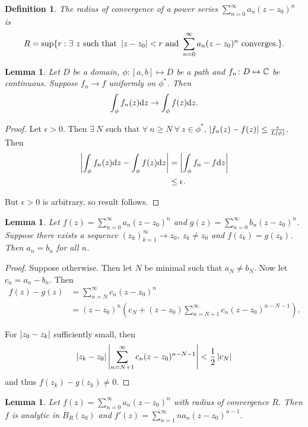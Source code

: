 \documentclass{notes}
\theoremstyle{plain}
\newtheorem{definition}[proposition]{Definition}
\newtheorem{lemma}[proposition]{Lemma}
\begin{document}
\begin{definition}
The radius of convergence of a power series
$\sum_{n=0}^\infty a_n (z-z_0)^n$ is
\[
R = \sup \{ r : \exists\ z \text{ such that } \left|z-z_0\right| < r \text{ and }
\sum_{n=0}^\infty a_n (z-z_0)^n \text{ converges.}\}.
\]
\end{definition}

\begin{lemma}
Let $D$ be a domain, $\phi \colon [a,b] \mapsto D$ be a path and $f_n \colon D \mapsto
\mathbb{C}$ be continuous.  Suppose $f_n \rightarrow f$ uniformly on $\phi^*$.  Then
\[
\int_\phi f_n(z) \mathrm{d} z \rightarrow \int_\phi f(z) \mathrm{d} z.
\]
\end{lemma}

\begin{proof}
Let $\epsilon > 0$.  Then $\exists\ N$ such that $\forall\ n \ge N\
\forall\ z \in \phi^*$, $\left|f_n(z)-f(z)\right| \le \frac{\epsilon}{L(\phi)}$.
Then
\begin{align*}
\left|\int_\phi f_n(z) \mathrm{d} z - \int_\phi f(z) \mathrm{d} z\right| &=
\left|\int_\phi f_n - f \mathrm{d} z\right| \\
&\le \epsilon.
\end{align*}

But $\epsilon > 0$ is arbitrary, so result follows. 
\end{proof}

\begin{lemma}
Let $f(z) = \sum_{n=0}^\infty a_n (z-z_0)^n$ and
$g(z) = \sum_{n=0}^\infty b_n (z-z_0)^n$.  Suppose there exists a sequence
$(z_k)_{k=1}^\infty \rightarrow z_0$, $z_k \neq z_0$ and $f(z_k) = g(z_k)$.
Then $a_n = b_n$ for all $n$.
\end{lemma}

\begin{proof}
Suppose otherwise.  Then let $N$ be minimal such that $a_N \neq b_N$.  Now
let $c_n = a_n - b_n$.  Then
\begin{align*}
f(z) - g(z) &= \sum_{n=N}^\infty c_n (z-z_0)^n \\
&= (z-z_0)^n \left( c_N + \left( z-z_0 \right) 
\sum_{n=N+1}^\infty c_n (z-z_0)^{n-N-1} \right).
\end{align*}

For $\left|z_0 - z_k\right|$ sufficiently small, then 
\[
\left|z_k - z_0\right| \left|\sum_{n=N+1}^\infty c_n (z-z_0)^{n-N-1}\right| < \frac{1}{2}
\left|c_N\right|
\]
and thus $f(z_k) - g(z_k) \neq 0$.
\end{proof}

\begin{lemma}
Let $f(z) = \sum_{n=0}^\infty a_n (z-z_0)^n$ with radius of convergence $R$.
Then $f$ is analytic in $B_R(z_0)$ and
$f'(z) = \sum_{n=1}^\infty n a_n (z-z_0)^{n-1}$. 
\end{lemma}
\end{document}
